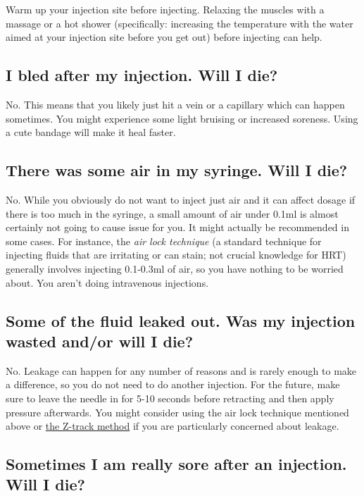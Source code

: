 \documentclass{article}
\begin{document}
Warm up your injection site before injecting. Relaxing the muscles with a massage or a hot shower (specifically: increasing the temperature with the water aimed at your injection site before you get out) before injecting can help.

\subsection{I bled after my injection. Will I die?}

No. This means that you likely just hit a vein or a capillary which can happen sometimes. You might experience some light bruising or increased soreness. Using a cute bandage will make it heal faster.

\subsection{There was some air in my syringe. Will I die?}\label{7-7}

No. While you obviously do not want to inject just air and it can affect dosage if there is too much in the syringe, a small amount of air under 0.1ml is almost certainly not going to cause issue for you. It might actually be recommended in some cases. For instance, the \textit{air lock technique} (a standard technique for injecting fluids that are irritating or can stain; not crucial knowledge for HRT) generally involves injecting 0.1-0.3ml of air, so you have nothing to be worried about. You aren’t doing intravenous injections.

\subsection{Some of the fluid leaked out. Was my injection wasted and/or will I die?}

No. Leakage can happen for any number of reasons and is rarely enough to make a difference, so you do not need to do another injection. For the future, make sure to leave the needle in for 5-10 seconds before retracting and then apply pressure afterwards. You might consider using the air lock technique mentioned above or \href{https://www.nurse.com/nursing-resources/definitions/what-is-z-track-method/}{the Z-track method} if you are particularly concerned about leakage.

\subsection{Sometimes I am really sore after an injection. Will I die?}
\end{document}
